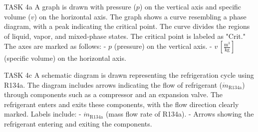TASK 4a  
A graph is drawn with pressure (\( p \)) on the vertical axis and specific volume (\( v \)) on the horizontal axis. The graph shows a curve resembling a phase diagram, with a peak indicating the critical point. The curve divides the regions of liquid, vapor, and mixed-phase states. The critical point is labeled as "Crit." The axes are marked as follows:  
- \( p \) (pressure) on the vertical axis.  
- \( v \, \left[\frac{\text{m}^3}{\text{kg}}\right] \) (specific volume) on the horizontal axis.  

TASK 4c  
A schematic diagram is drawn representing the refrigeration cycle using R134a. The diagram includes arrows indicating the flow of refrigerant (\( \dot{m}_{\text{R134a}} \)) through components such as a compressor and an expansion valve. The refrigerant enters and exits these components, with the flow direction clearly marked. Labels include:  
- \( \dot{m}_{\text{R134a}} \) (mass flow rate of R134a).  
- Arrows showing the refrigerant entering and exiting the components.